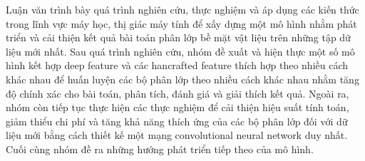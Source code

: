 \begin{abstracts}         
Luận văn trình bày quá trình nghiên cứu, thực nghiệm và áp dụng các kiến thức trong lĩnh vực máy học, thị giác máy tính để xấy dựng một mô hình nhằm phát triển và cải thiện kết quả bài toán phân lớp bề mặt vật liệu trên những tập dữ liệu mới nhất. Sau quá trình nghiên cứu, nhóm đề xuất và hiện thực một số mô hình kết hợp deep feature và các hancrafted feature thích hợp theo nhiều cách khác nhau để huấn luyện các bộ phân lớp theo nhiều cách khác nhau nhằm tăng độ chính xác cho bài toán, phân tích, đánh giá và giải thích kết quả. Ngoài ra, nhóm còn tiếp tục thực hiện các thực nghiệm để cải thiện hiệu suất tính toán, giảm thiểu chi phí và tăng khả năng thích ứng của các bộ phân lớp đối với dữ liệu mới bằng cách thiết kế một mạng convolutional neural network duy nhất. Cuối cùng nhóm đề ra những hướng phát triển tiếp theo của mô hình.
\end{abstracts}
 